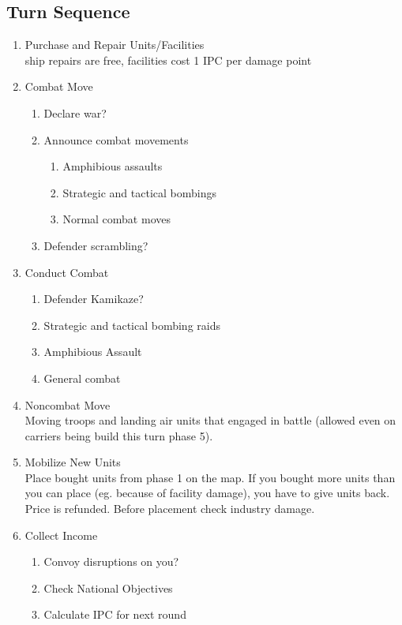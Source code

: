 \documentclass[10pt,twoside]{article}
\begin{document}
\begin{multicols*}{3}

\section*{Turn Sequence}
\begin{enumerate}
\item Purchase and Repair Units/Facilities\\
ship repairs are free, facilities cost 1 IPC per damage point 
\item Combat Move
\begin{enumerate}
\item Declare war?
\item Announce combat movements
\begin{enumerate}
\item Amphibious assaults
\item Strategic and tactical bombings
\item Normal combat moves
\end{enumerate}
\item Defender scrambling?
\end{enumerate}
\item Conduct Combat
\begin{enumerate}
\item Defender Kamikaze?
\item Strategic and tactical bombing raids
\item Amphibious Assault
\item General combat
\end{enumerate}
\item Noncombat Move\\
Moving troops and landing air units that engaged in battle (allowed even on carriers being build this turn phase 5).
\item Mobilize New Units\\
Place bought units from phase 1 on the map. If you bought more units than you can place (eg. because of facility damage), you have to give units back. Price is refunded. Before placement check industry damage.
\item Collect Income
\begin{enumerate}
\item Convoy disruptions on you?
\item Check National Objectives
\item Calculate IPC for next round
\end{enumerate}
\end{enumerate}
\columnbreak


\end{multicols*}
\end{document}

